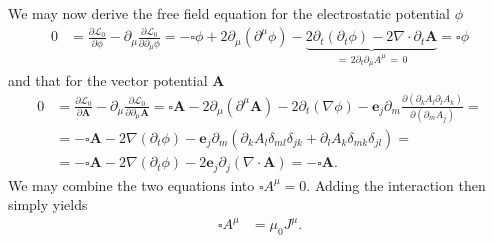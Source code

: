 \documentclass[english, parskip=full]{scrartcl}
\newcommand{\kla}{}
\begin{document}
We may now derive the free field equation for the electrostatic potential $\phi$ 
\begin{align}
0 &= \frac{\partial\mathcal{L}_0}{\partial\phi} - \partial_\mu \frac{\partial \mathcal{L}_0}{\partial \partial_\mu \phi} = -\square \phi + 2\partial_\mu \kla\left( \partial^\mu \phi \right) - \underbrace{2\partial_t \kla\left( \partial_t\phi \right) - 2\nabla \cdot \partial_t\textbf{A}}_{=\, 2\partial_t \partial_\mu A^\mu\,=\,0} =  \square \phi
\end{align}
and that for the vector potential $\textbf{A}$
\begin{align}
0 &= \frac{\partial\mathcal{L}_0}{\partial\textbf{A}} - \partial_\mu \frac{\partial \mathcal{L}_0}{\partial \partial_\mu \textbf{A}} = \square \textbf{A} - 2\partial_\mu \kla\left( \partial^\mu \textbf{A} \right) -2\partial_t (\nabla\phi) - \textbf{e}_j \partial_m \frac{\partial \kla\left( \partial_k A_l\partial_l A_k \right)}{\partial (\partial_m A_j)} = \\
&= -\square \textbf{A} - 2\nabla \kla\left( \partial_t\phi \right) - \textbf{e}_j \partial_m \kla\left( \partial_k A_l \delta_{ml}\delta_{jk} + \partial_l A_k \delta_{mk}\delta_{jl} \right) = \\
&= -\square \textbf{A} - 2\nabla (\partial_t\phi) - 2\textbf{e}_j\partial_j (\nabla\cdot \textbf{A}) = -\square \textbf{A}.
\end{align}
We may combine the two equations into $\square A^\mu = 0$.
Adding the interaction then simply yields
\begin{align}
\square A^\mu &= \mu_0 J^\mu. \label{eqn:four potential PDE}
\end{align}
\end{document}
